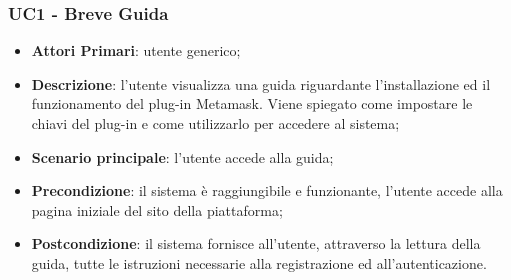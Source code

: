 
\subsubsection{UC1 - Breve Guida}
\begin{itemize}
	\item \textbf{Attori Primari}: utente generico;
	\item \textbf{Descrizione}: l'utente visualizza una guida riguardante l'installazione ed il funzionamento del plug-in Metamask\glosp. Viene spiegato come impostare le chiavi del plug-in e come utilizzarlo per accedere al sistema;
	\item \textbf{Scenario principale}: l'utente accede alla guida;
	\item \textbf{Precondizione}: il sistema è raggiungibile e funzionante, l'utente accede alla pagina iniziale del sito della piattaforma;
	\item \textbf{Postcondizione}: il sistema fornisce all'utente, attraverso la lettura della guida, tutte le istruzioni necessarie alla registrazione ed all'autenticazione.
	
	
\end{itemize}
